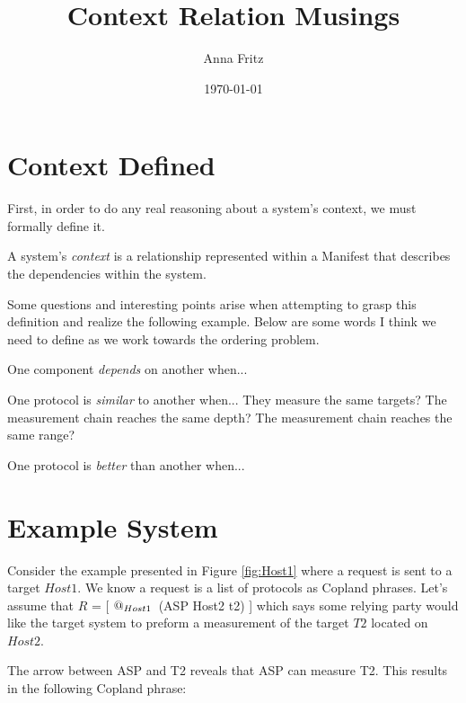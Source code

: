 \documentclass[12pt, letterpaper]{article}
\title{Context Relation Musings}
\author{Anna Fritz}
\date{\today}
\begin{document}
\maketitle

\section{Context Defined}

First, in order to do any real reasoning about a system's context, we must formally define it. 

\begin{defn}[Context]
  A system's \emph{context} is a relationship represented within a Manifest that describes the dependencies within the system. 
\end{defn}

Some questions and interesting points arise when attempting to grasp this definition and realize the following example. Below are some words I think we need to define as we work towards the ordering problem. 

\begin{defn}[Dependency] 
  One component \emph{depends} on another when... 
\end{defn}

\begin{defn}[Similar] 
  One protocol is \emph{similar} to another when... They measure the same targets? The measurement chain reaches the same depth? The measurement chain reaches the same range? 
\end{defn}

\begin{defn}[Better] 
  One protocol is \emph{better} than another when... 
\end{defn}

\section{Example System}

Consider the example presented in Figure \ref{fig:Host1} where a request is sent to a target $Host1$. We know a request is a list of protocols as Copland phrases. Let's assume that $R$ = [ $\mathop{@_{Host1}}{} $ (ASP Host2 t2) ] which says some relying party would like the target system to preform a measurement of the target $T2$ located on $Host2$. 

The arrow between ASP and T2 reveals that ASP can measure T2. This results in the following Copland phrase: 
\end{document}

